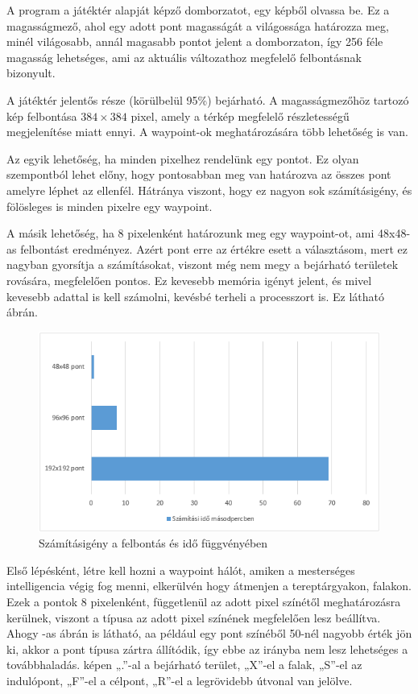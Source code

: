 A program a játéktér alapját képző domborzatot, egy képből olvassa be. Ez a magasságmező, ahol egy adott pont magasságát a világossága határozza meg, minél világosabb, annál magasabb pontot jelent a domborzaton, így 256 féle magasság lehetséges, ami az aktuális változathoz megfelelő felbontásnak bizonyult. 

A játéktér jelentős része (körülbelül 95\%) bejárható. A magasságmezőhöz tartozó kép felbontása $384 \times 384$ pixel, amely a térkép megfelelő részletességű megjelenítése miatt ennyi. A waypoint-ok meghatározására több lehetőség is van.

Az egyik lehetőség, ha minden pixelhez rendelünk egy pontot. Ez olyan szempontból lehet előny, hogy pontosabban meg van határozva az összes pont amelyre léphet az ellenfél. Hátránya viszont, hogy ez nagyon sok számításigény, és fölösleges is minden pixelre egy waypoint.

A másik lehetőség, ha 8 pixelenként határozunk meg egy waypoint-ot, ami 48x48-as felbontást eredményez. Azért pont erre az értékre esett a választásom, mert ez nagyban gyorsítja a számításokat, viszont még nem megy a bejárható területek rovására, megfelelően pontos. Ez kevesebb memória igényt jelent, és mivel kevesebb adattal is kell számolni, kevésbé terheli a processzort is. Ez látható  ábrán.

\begin{figure}[h]
\centering
\includegraphics[scale=0.9]{kepek/utvonal_szamitas_diagram_waypointokra.png}
\caption{Számításigény a felbontás és idő függvényében}
\label{fig:diagram_utvonal}
\end{figure}

Első lépésként, létre kell hozni a waypoint hálót, amiken a mesterséges intelligencia végig fog menni, elkerülvén hogy átmenjen a tereptárgyakon, falakon. Ezek a pontok 8 pixelenként, függetlenül az adott pixel színétől meghatározásra kerülnek, viszont a típusa az adott pixel színének megfelelően lesz beállítva. Ahogy -as ábrán is látható, aa például egy pont színéből 50-nél nagyobb érték jön ki, akkor a pont típusa zártra állítódik, így ebbe az irányba nem lesz lehetséges a továbbhaladás.   képen „.”-al a bejárható terület, „X”-el a falak, „S”-el az indulópont, „F”-el a célpont, „R”-el a legrövidebb útvonal van jelölve.

